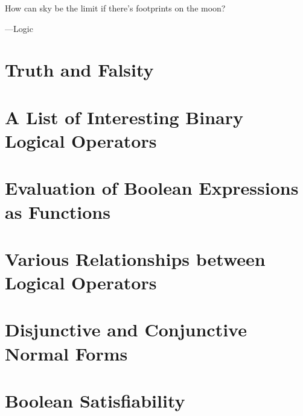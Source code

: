 \epigraph{How can sky be the limit if there's footprints on the moon?}{---Logic}



\section{Truth and Falsity}


\section{A List of Interesting Binary Logical Operators}


\section{Evaluation of Boolean Expressions as Functions}


\section{Various Relationships between Logical Operators}


\section{Disjunctive and Conjunctive Normal Forms}


\section{Boolean Satisfiability}
